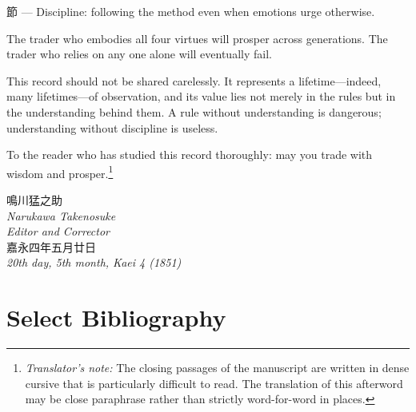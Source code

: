 \documentclass[10pt, openany]{book}
\newcommand{\jp}[1]{{\japanesefont #1}}
\newcommand{\tn}[1]{\footnote{\textit{Translator's note:} #1}}
\begin{document}
\jp{節} --- Discipline: following the method even when emotions urge
otherwise.

The trader who embodies all four virtues will prosper across generations.
The trader who relies on any one alone will eventually fail.

This record should not be shared carelessly. It represents a
lifetime---indeed, many lifetimes---of observation, and its value lies not
merely in the rules but in the understanding behind them. A rule without
understanding is dangerous; understanding without discipline is useless.

To the reader who has studied this record thoroughly: may you trade with
wisdom and prosper.\tn{The closing passages of the manuscript are written
in dense cursive that is particularly difficult to read. The translation
of this afterword may be close paraphrase rather than strictly
word-for-word in places.}

\begin{flushright}
\jp{鳴川猛之助}\\
\textit{Narukawa Takenosuke}\\
\textit{Editor and Corrector}\\[0.5em]
\jp{嘉永四年五月廿日}\\
\textit{20th day, 5th month, Kaei 4 (1851)}
\end{flushright}

\chapter*{Select Bibliography}
\end{document}
